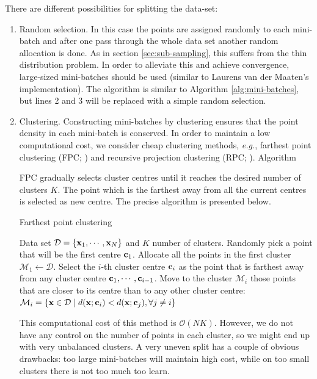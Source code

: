There are different possibilities for splitting the data-set:
\begin{enumerate}
	\item Random selection. In this case the points are assigned randomly to each
mini-batch and after one pass through the whole data set another random
allocation is done. As in section \ref{sec:sub-sampling}, this suffers from the
thin distribution problem. In order to alleviate this and achieve convergence,
large-sized mini-batches should be used (similar to Laurens van der Maaten's
implementation). The algorithm is similar to Algorithm \ref{alg:mini-batches},
but lines 2 and 3 will be replaced with a simple random selection.
	
	\item Clustering. Constructing mini-batches by clustering ensures that the
point density in each mini-batch is conserved. In order to maintain a low
computational cost, we consider cheap clustering methods, \textit{e.g.},
farthest point clustering (FPC; \citealp{gonzalez1985}) and recursive projection
clustering (RPC; \citealp{chalupka2011}). Algorithm 
	
	FPC gradually selects cluster centres until it reaches the desired number of
clusters $K$. The point which is the farthest away from all the current centres
is selected as new centre. The precise algorithm is presented below.
	
	\begin{algorithm} 
		\caption{Farthest point clustering} 
		\label{alg:fpc}  
		\begin{algorithmic}                    %
			\REQUIRE Data set $\mathcal{D}=\{\mathbf{x}_1,\cdots,\mathbf{x}_N\}$ and $K$ number of
clusters.
			\STATE Randomly pick a point that will be the first centre $\mathbf{c}_1$.
			\STATE Allocate all the points in the first cluster $\mathcal{M}_1 \leftarrow
\mathcal{D}$.
				\STATE Select the $i$-th cluster centre $\mathbf{c}_i$ as the point that is
farthest away from any cluster centre $\mathbf{c}_1,\cdots,\mathbf{c}_{i-1}$.
				\STATE Move to the cluster $\mathcal{M}_i$ those points that are closer to
its centre than to any other cluster centre: $\mathcal{M}_i = \left\{ \mathbf{x} \in
\mathcal{D} \;| \; d(\mathbf{x};\mathbf{c}_i) < d(\mathbf{x};\mathbf{c}_j), \forall j \neq i \right\}$
			\ENDFOR
		\end{algorithmic}
	\end{algorithm}
	
	This computational cost of this method is $\mathcal{O}(NK)$. However, we do not
have any control on the number of points in each cluster, so we might end up
with very unbalanced clusters. A very uneven split has a couple of obvious
drawbacks: too large mini-batches will maintain high cost, while on too small
clusters there is not too much too learn.
	

\end{enumerate}
